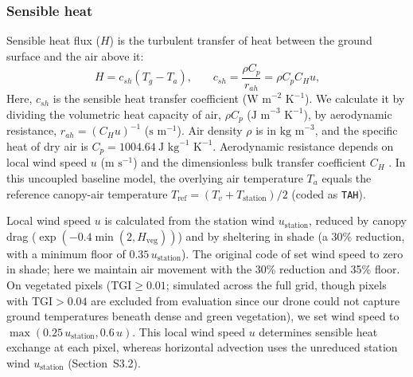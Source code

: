 \documentclass[12pt]{article}
\begin{document}
\subsubsection{Sensible heat}

\noindent Sensible heat flux ($H$) is the turbulent transfer of heat between the ground surface and the air above it:
\begin{equation} \label{eq:H}
H = c_{sh} (T_g - T_a) \textrm{,} \qquad c_{sh} = \frac{\rho C_p}{r_{ah}} = \rho C_p C_H u \textrm{,}
\end{equation}
\noindent Here, $c_{sh}$ is the sensible heat transfer coefficient ($\textrm{W m}^{-2}\textrm{ K}^{-1}$). We calculate it by dividing the volumetric heat capacity of air, $\rho C_p$ ($\textrm{J m}^{-3}\textrm{ K}^{-1}$), by aerodynamic resistance, $r_{ah} = (C_H u)^{-1}$ ($\textrm{s m}^{-1}$). Air density $\rho$ is in $\textrm{kg m}^{-3}$, and the specific heat of dry air is $C_p = 1004.64~\textrm{J kg}^{-1}\textrm{ K}^{-1}$. Aerodynamic resistance depends on local wind speed $u$ ($\textrm{m s}^{-1}$) and the dimensionless bulk transfer coefficient $C_H$ \citep{levy_2016b}. In this uncoupled baseline model, the overlying air temperature $T_a$ equals the reference canopy-air temperature $T_{\textrm{ref}} = (T_v + T_{\textrm{station}})/2$ (coded as \texttt{TAH}).

Local wind speed $u$ is calculated from the station wind $u_{\textrm{station}}$, reduced by canopy drag ($\exp(-0.4 \min(2, H_{\textrm{veg}}))$) and by sheltering in shade (a 30\% reduction, with a minimum floor of $0.35\,u_{\textrm{station}}$). The original code of \citet{Itzkovitch2025} set wind speed to zero in shade; here we maintain air movement with the 30\% reduction and 35\% floor. On vegetated pixels ($\text{TGI} \ge 0.01$; simulated across the full grid, though pixels with $\text{TGI} > 0.04$ are excluded from evaluation since our drone could not capture ground temperatures beneath dense and green vegetation), we set wind speed to $\max(0.25\,u_{\textrm{station}}, 0.6\,u)$. This local wind speed $u$ determines sensible heat exchange at each pixel, whereas horizontal advection uses the unreduced station wind $u_{\textrm{station}}$ (Section~S3.2).
\end{document}

